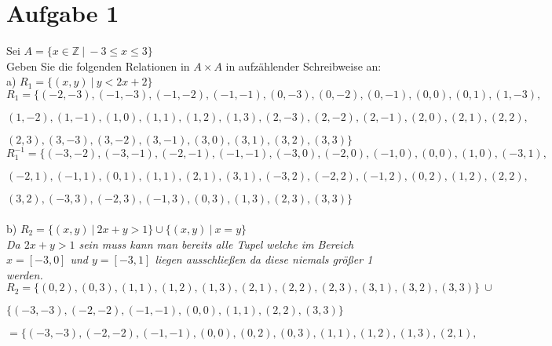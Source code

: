 \section{Aufgabe 1}

Sei $A = \{x \in \mathbb{Z} \ | \ -3 \leq x \leq 3\}$\\

Geben Sie die folgenden Relationen in $A \times A$ in aufzählender Schreibweise an:\\

a) $R_1 = \{(x,y) \ | \ y < 2x + 2\}$\\

$R_1 = \{(-2,-3), (-1,-3), (-1,-2), (-1,-1), (0,-3), (0,-2), (0,-1), (0,0), (0,1), (1,-3),$

\hspace{1.3cm}$(1,-2), (1,-1), (1,0), (1,1), (1,2), (1,3), (2,-3), (2,-2), (2,-1), (2,0), (2,1), (2,2),$

\hspace{1.3cm}$(2,3), (3,-3), (3,-2), (3,-1), (3,0), (3,1), (3,2), (3,3)\}$\\

$R_{1}^{-1} = \{(-3,-2), (-3,-1), (-2,-1), (-1,-1), (-3,0), (-2,0), (-1,0), (0,0), (1,0), (-3,1),$

\hspace{1.5cm}$(-2,1), (-1,1), (0,1), (1,1), (2,1), (3,1), (-3,2), (-2,2), (-1,2), (0,2), (1,2), (2,2),$

\hspace{1.5cm}$(3,2), (-3,3), (-2,3), (-1,3), (0,3), (1,3), (2,3), (3,3)\}$\\~\\

b) $R_2 = \{(x,y) \ | \ 2x + y > 1\} \cup \{(x,y) \ | \ x = y\}$\\

\textit{Da $2x + y > 1$ sein muss kann man bereits alle Tupel welche im Bereich $x = [-3, 0]$ und $y = [-3, 1]$ liegen ausschließen da diese niemals größer 1 werden.}\\

$R_2 = \{(0,2), (0,3), (1,1), (1,2), (1,3), (2,1), (2,2), (2,3), (3,1), (3,2), (3,3)\} \ \cup$

\hspace{1.05cm}$\{(-3,-3), (-2,-2), (-1,-1), (0,0), (1,1), (2,2), (3,3)\}$

\hspace{0.63cm}$ = \{(-3,-3), (-2,-2), (-1,-1), (0,0), (0,2), (0,3), (1,1), (1,2), (1,3), (2,1),$

